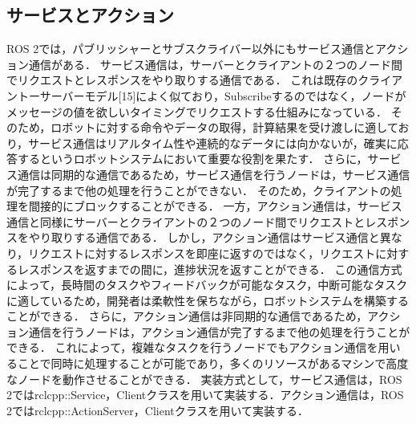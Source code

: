 \subsection{サービスとアクション}
ROS 2では，パブリッシャーとサブスクライバー以外にもサービス通信とアクション通信がある．
サービス通信は，サーバーとクライアントの２つのノード間でリクエストとレスポンスをやり取りする通信である．
これは既存のクライアントーサーバーモデル[15]によく似ており，Subscribeするのではなく，ノードがメッセージの値を欲しいタイミングでリクエストする仕組みになっている．
そのため，ロボットに対する命令やデータの取得，計算結果を受け渡しに適しており，サービス通信はリアルタイム性や連続的なデータには向かないが，確実に応答するというロボットシステムにおいて重要な役割を果たす．
さらに，サービス通信は同期的な通信であるため，サービス通信を行うノードは，サービス通信が完了するまで他の処理を行うことができない．
そのため，クライアントの処理を間接的にブロックすることができる．
一方，アクション通信は，サービス通信と同様にサーバーとクライアントの２つのノード間でリクエストとレスポンスをやり取りする通信である．
しかし，アクション通信はサービス通信と異なり，リクエストに対するレスポンスを即座に返すのではなく，リクエストに対するレスポンスを返すまでの間に，進捗状況を返すことができる．
この通信方式によって，長時間のタスクやフィードバックが可能なタスク，中断可能なタスクに適しているため，開発者は柔軟性を保ちながら，ロボットシステムを構築することができる．
さらに，アクション通信は非同期的な通信であるため，アクション通信を行うノードは，アクション通信が完了するまで他の処理を行うことができる．
これによって，複雑なタスクを行うノードでもアクション通信を用いることで同時に処理することが可能であり，多くのリソースがあるマシンで高度なノードを動作させることができる．
実装方式として，サービス通信は，ROS 2ではrclcpp::Service，Clientクラスを用いて実装する．アクション通信は，ROS 2ではrclcpp::ActionServer，Clientクラスを用いて実装する．

